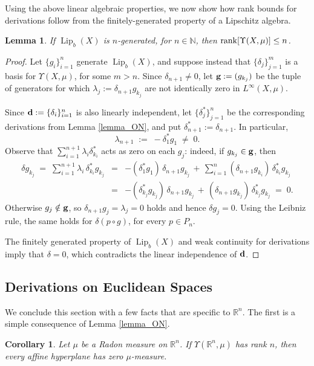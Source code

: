 \documentclass[reqno]{amsart}
\theoremstyle{plain}
\newtheorem{cor}[thm]{Corollary}
\newtheorem{lemma}[thm]{Lemma}
\theoremstyle{definition}
\theoremstyle{remark}
\numberwithin{equation}{section}
\renewcommand{\d}{\delta}
\newcommand{\Lip}{\operatorname{Lip}}
\newcommand{\N}{\mathbb{N}}
\newcommand{\R}{\mathbb{R}}
\newcommand{\U}{\Upsilon}
\begin{document}
Using the above linear algebraic properties, we now show how rank bounds for derivations follow from the finitely-generated property of a Lipschitz algebra.

\begin{lemma} \label{lemma_fingenbd}
If $\Lip_b(X)$ is $n$-generated, for $n \in \N$, then ${\rm rank}[\U(X,\mu)] \leq n$.
\end{lemma}

\begin{proof}
Let $\{g_i\}_{i=1}^n$ generate $\Lip_b(X)$, and suppose instead that $\{\d_j\}_{j=1}^m$ is a basis for $\U(X,\mu)$, for some $m > n$.  Since $\d_{n+1} \neq 0$, let ${\bf g} := (g_{k_j})$ be the tuple of generators for which $\lambda_j := \d_{n+1}g_{k_j}$ are not identically zero in $L^\infty(X,\mu)$.

Since ${\bf d} := \{\d_i\}_{i=1}^n$ is also linearly independent, let $\{\d^*_j\}_{j=1}^n$ be the corresponding derivations from Lemma \ref{lemma_ON}, and put $\d_{n+1}^* := \d_{n+1}$.  In particular,
$$
\lambda_{n+1} \;:=\; -\d^*_1g_1 \;\neq\; 0.
$$
Observe that $\sum_{i=1}^{n+1} \lambda_i \d^*_{k_i}$ acts as zero on each $g_j$: indeed, if $g_{k_j} \in {\bf g}$, then 
\begin{eqnarray*}
\d g_{k_j} \;=\;
\sum_{i=1}^{n+1} \lambda_i \, \d^*_{k_i}g_{k_j} &=&
-(\d^*_1g_1) \, \d_{n+1}g_{k_j} \,+\, \sum_{i=1}^n (\d_{n+1}g_{k_i}) \, \d^*_{k_i}g_{k_j} \\ &=&
-(\d^*_{k_j}g_{k_j}) \, \d_{n+1}g_{k_j} \,+\, (\d_{n+1}g_{k_j}) \, \d^*_{k_j}g_{k_j} \;=\; 0.
\end{eqnarray*}
Otherwise $g_j \notin {\bf g}$, so $\d_{n+1}g_j = \lambda_j = 0$ holds and hence $\d g_j = 0$.  Using the Leibniz rule, the same holds for $\d (p \circ g)$, for every $p \in P_n$.

The finitely generated property of $\Lip_b(X)$ and weak continuity for derivations imply that $\d = 0$, which contradicts the linear independence of ${\bf d}$.
\end{proof}



\subsection{Derivations on Euclidean Spaces}

We conclude this section with a few facts that are specific to $\R^n$.  The first is a simple consequence of Lemma \ref{lemma_ON}.

\begin{cor} \label{cor_planezero}
Let $\mu$ be a Radon measure on $\R^n$.  If $\U(\R^n,\mu)$ has rank $n$, then every affine hyperplane has zero $\mu$-measure.
\end{cor}
\end{document}
